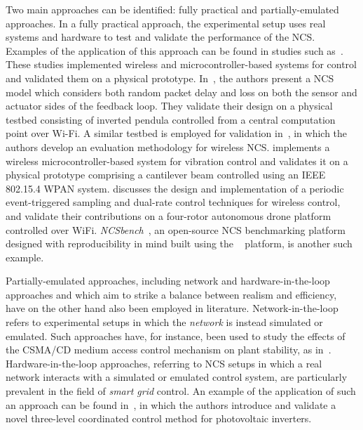 Two main approaches can be identified: fully practical and partially-emulated approaches.
In a fully practical approach, the experimental setup uses real systems and hardware to test and validate the performance of the \gls{NCS}.
Examples of the application of this approach can be found in studies such as~\cite{drew2005networked,baumann2018evaluating,li2014wireless,cuenca2019periodic}.
These studies implemented wireless and microcontroller-based systems for control and validated them on a physical prototype.
In~\cite{drew2005networked}, the authors present a \gls{NCS} model which considers both random packet delay and loss on both the sensor and actuator sides of the feedback loop.
They validate their design on a physical testbed consisting of inverted pendula controlled from a central computation point over Wi-Fi.
A similar testbed is employed for validation in~\cite{baumann2018evaluating}, in which the authors develop an evaluation methodology for wireless \gls{NCS}.\@
\cite{li2014wireless} implements a wireless microcontroller-based system for vibration control and validates it on a physical prototype comprising a cantilever beam controlled using an \acs{IEEE} 802.15.4 \gls{WPAN} system.\@ \cite{cuenca2019periodic} discusses the design and implementation of a periodic event-triggered sampling and dual-rate control techniques for wireless control, and validate their contributions on a four-rotor autonomous drone platform controlled over WiFi.
\emph{NCSbench}~\cite{zoppi2020ncsbench}, an open-source \gls{NCS} benchmarking platform designed with reproducibility in mind built using the ~\cite{LEGOMindstormsEV3} platform, is another such example.

Partially-emulated approaches, including network and hardware-in-the-loop approaches and which aim to strike a balance between realism and efficiency, have on the other hand also been employed in literature.
Network-in-the-loop refers to experimental setups in which the \emph{network} is instead simulated or emulated.
Such approaches have, for instance, been used to study the effects of the \gls{CSMA/CD} medium access control mechanism on plant stability, as in~\cite{natale2004inverted}.
Hardware-in-the-loop approaches, referring to \gls{NCS} setups in which a real network interacts with a simulated or emulated control system, are particularly prevalent in the field of \emph{smart grid} control.
An example of the application of such an approach can be found in~\cite{wang2020inverter}, in which the authors introduce and validate a novel three-level coordinated control method for photovoltaic inverters.


